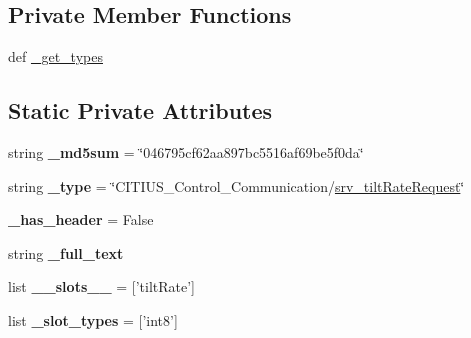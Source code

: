\subsection*{\-Private \-Member \-Functions}
\begin{DoxyCompactItemize}
\item 
def \hyperlink{class_c_i_t_i_u_s___control___communication_1_1srv_1_1__srv__tilt_rate_1_1srv__tilt_rate_request_ab461b8d8a8b0d59d4f47dfb69411589e}{\-\_\-get\-\_\-types}
\end{DoxyCompactItemize}
\subsection*{\-Static \-Private \-Attributes}
\begin{DoxyCompactItemize}
\item 
\hypertarget{class_c_i_t_i_u_s___control___communication_1_1srv_1_1__srv__tilt_rate_1_1srv__tilt_rate_request_a580d03d0b0bb5c14bf5886cc02ca82cb}{string {\bfseries \-\_\-md5sum} = \char`\"{}046795cf62aa897bc5516af69be5f0da\char`\"{}}\label{class_c_i_t_i_u_s___control___communication_1_1srv_1_1__srv__tilt_rate_1_1srv__tilt_rate_request_a580d03d0b0bb5c14bf5886cc02ca82cb}

\item 
\hypertarget{class_c_i_t_i_u_s___control___communication_1_1srv_1_1__srv__tilt_rate_1_1srv__tilt_rate_request_ab9378839d72d3bfbd41c05965174eda4}{string {\bfseries \-\_\-type} = \char`\"{}\-C\-I\-T\-I\-U\-S\-\_\-\-Control\-\_\-\-Communication/\hyperlink{class_c_i_t_i_u_s___control___communication_1_1srv_1_1__srv__tilt_rate_1_1srv__tilt_rate_request}{srv\-\_\-tilt\-Rate\-Request}\char`\"{}}\label{class_c_i_t_i_u_s___control___communication_1_1srv_1_1__srv__tilt_rate_1_1srv__tilt_rate_request_ab9378839d72d3bfbd41c05965174eda4}

\item 
\hypertarget{class_c_i_t_i_u_s___control___communication_1_1srv_1_1__srv__tilt_rate_1_1srv__tilt_rate_request_aaa1cd4099e3b9fb429e160b6d5c1099a}{{\bfseries \-\_\-has\-\_\-header} = \-False}\label{class_c_i_t_i_u_s___control___communication_1_1srv_1_1__srv__tilt_rate_1_1srv__tilt_rate_request_aaa1cd4099e3b9fb429e160b6d5c1099a}

\item 
string {\bfseries \-\_\-full\-\_\-text}
\item 
\hypertarget{class_c_i_t_i_u_s___control___communication_1_1srv_1_1__srv__tilt_rate_1_1srv__tilt_rate_request_adf6c22746ed833f3d09c3cd540f98e03}{list {\bfseries \-\_\-\-\_\-slots\-\_\-\-\_\-} = \mbox{[}'tilt\-Rate'\mbox{]}}\label{class_c_i_t_i_u_s___control___communication_1_1srv_1_1__srv__tilt_rate_1_1srv__tilt_rate_request_adf6c22746ed833f3d09c3cd540f98e03}

\item 
\hypertarget{class_c_i_t_i_u_s___control___communication_1_1srv_1_1__srv__tilt_rate_1_1srv__tilt_rate_request_a5a52aa75de92c610f9a6d144e9e98510}{list {\bfseries \-\_\-slot\-\_\-types} = \mbox{[}'int8'\mbox{]}}\label{class_c_i_t_i_u_s___control___communication_1_1srv_1_1__srv__tilt_rate_1_1srv__tilt_rate_request_a5a52aa75de92c610f9a6d144e9e98510}

\end{DoxyCompactItemize}


